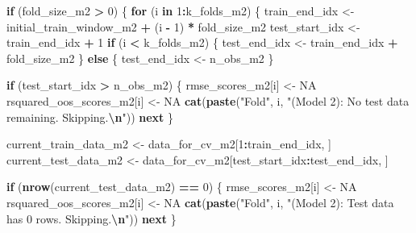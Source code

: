 \documentclass[
]{article}
\newenvironment{Shaded}{\begin{snugshade}}{\end{snugshade}}
\newcommand{\ConstantTok}[1]{\textcolor[rgb]{0.56,0.35,0.01}{#1}}
\newcommand{\ControlFlowTok}[1]{\textcolor[rgb]{0.13,0.29,0.53}{\textbf{#1}}}
\newcommand{\DecValTok}[1]{\textcolor[rgb]{0.00,0.00,0.81}{#1}}
\newcommand{\FunctionTok}[1]{\textcolor[rgb]{0.13,0.29,0.53}{\textbf{#1}}}
\newcommand{\NormalTok}[1]{#1}
\newcommand{\OtherTok}[1]{\textcolor[rgb]{0.56,0.35,0.01}{#1}}
\newcommand{\SpecialCharTok}[1]{\textcolor[rgb]{0.81,0.36,0.00}{\textbf{#1}}}
\newcommand{\StringTok}[1]{\textcolor[rgb]{0.31,0.60,0.02}{#1}}
\begin{document}
\begin{Shaded}
\begin{Highlighting}[]
  \ControlFlowTok{if}\NormalTok{ (fold\_size\_m2 }\SpecialCharTok{\textgreater{}} \DecValTok{0}\NormalTok{) \{}
    \ControlFlowTok{for}\NormalTok{ (i }\ControlFlowTok{in} \DecValTok{1}\SpecialCharTok{:}\NormalTok{k\_folds\_m2) \{}
\NormalTok{      train\_end\_idx }\OtherTok{\textless{}{-}}\NormalTok{ initial\_train\_window\_m2 }\SpecialCharTok{+}\NormalTok{ (i }\SpecialCharTok{{-}} \DecValTok{1}\NormalTok{) }\SpecialCharTok{*}\NormalTok{ fold\_size\_m2}
\NormalTok{      test\_start\_idx }\OtherTok{\textless{}{-}}\NormalTok{ train\_end\_idx }\SpecialCharTok{+} \DecValTok{1}
      \ControlFlowTok{if}\NormalTok{ (i }\SpecialCharTok{\textless{}}\NormalTok{ k\_folds\_m2) \{}
\NormalTok{        test\_end\_idx }\OtherTok{\textless{}{-}}\NormalTok{ train\_end\_idx }\SpecialCharTok{+}\NormalTok{ fold\_size\_m2}
\NormalTok{      \} }\ControlFlowTok{else}\NormalTok{ \{}
\NormalTok{        test\_end\_idx }\OtherTok{\textless{}{-}}\NormalTok{ n\_obs\_m2 }
\NormalTok{      \}}
  
      \ControlFlowTok{if}\NormalTok{ (test\_start\_idx }\SpecialCharTok{\textgreater{}}\NormalTok{ n\_obs\_m2) \{}
\NormalTok{        rmse\_scores\_m2[i] }\OtherTok{\textless{}{-}} \ConstantTok{NA}
\NormalTok{        rsquared\_oos\_scores\_m2[i] }\OtherTok{\textless{}{-}} \ConstantTok{NA}
        \FunctionTok{cat}\NormalTok{(}\FunctionTok{paste}\NormalTok{(}\StringTok{"Fold"}\NormalTok{, i, }\StringTok{"(Model 2): No test data remaining. Skipping.}\SpecialCharTok{\textbackslash{}n}\StringTok{"}\NormalTok{))}
        \ControlFlowTok{next}
\NormalTok{      \}}
      
\NormalTok{      current\_train\_data\_m2 }\OtherTok{\textless{}{-}}\NormalTok{ data\_for\_cv\_m2[}\DecValTok{1}\SpecialCharTok{:}\NormalTok{train\_end\_idx, ]}
\NormalTok{      current\_test\_data\_m2  }\OtherTok{\textless{}{-}}\NormalTok{ data\_for\_cv\_m2[test\_start\_idx}\SpecialCharTok{:}\NormalTok{test\_end\_idx, ]}
  
      \ControlFlowTok{if}\NormalTok{ (}\FunctionTok{nrow}\NormalTok{(current\_test\_data\_m2) }\SpecialCharTok{==} \DecValTok{0}\NormalTok{) \{}
\NormalTok{          rmse\_scores\_m2[i] }\OtherTok{\textless{}{-}} \ConstantTok{NA}
\NormalTok{          rsquared\_oos\_scores\_m2[i] }\OtherTok{\textless{}{-}} \ConstantTok{NA}
          \FunctionTok{cat}\NormalTok{(}\FunctionTok{paste}\NormalTok{(}\StringTok{"Fold"}\NormalTok{, i, }\StringTok{"(Model 2): Test data has 0 rows. Skipping.}\SpecialCharTok{\textbackslash{}n}\StringTok{"}\NormalTok{))}
          \ControlFlowTok{next}
\NormalTok{      \}}
      

\end{Highlighting}
\end{Shaded}
\end{document}
